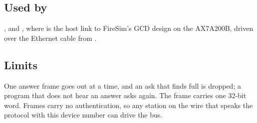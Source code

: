 \subsection*{Used by}

, and , where
 is the host link to FireSim's GCD design on the
AX7A200B, driven over the Ethernet cable from .

\subsection*{Limits}

One answer frame goes out at a time, and an ask that finds 
full is dropped; a program that does not hear an answer asks again.
The frame carries one 32-bit word. Frames carry no authentication, so
any station on the wire that speaks the protocol with this device
number can drive the bus.
